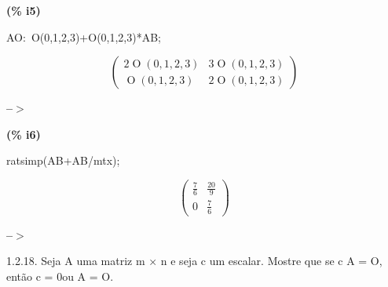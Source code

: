 \documentclass[fleqn]{article}
\begin{document}
\noindent
\begin{minipage}[t]{4.000000em}\color{red}\bfseries
(\% i5)	
\end{minipage}
\begin{minipage}[t]{\textwidth}\color{blue}
AO:\ O(0,1,2,3)+O(0,1,2,3)*AB;
\end{minipage}
\[\displaystyle \tag{AO} 
\begin{pmatrix}2 \mathop{O}\left( 0\mathop{,}1\mathop{,}2\mathop{,}3\right)  & 3 \mathop{O}\left( 0\mathop{,}1\mathop{,}2\mathop{,}3\right) \\
\mathop{O}\left( 0\mathop{,}1\mathop{,}2\mathop{,}3\right)  & 2 \mathop{O}\left( 0\mathop{,}1\mathop{,}2\mathop{,}3\right) \end{pmatrix}\mbox{}
\]


\noindent
\begin{minipage}[t]{4.000000em}\color{red}\bfseries
 --\ensuremath{\ensuremath{>}}	
\end{minipage}
\begin{minipage}[t]{\textwidth}\color{blue}

\end{minipage}

\noindent%



\noindent
\begin{minipage}[t]{4.000000em}\color{red}\bfseries
(\% i6)	
\end{minipage}
\begin{minipage}[t]{\textwidth}\color{blue}
ratsimp(AB+AB/mtx);
\end{minipage}
\[\displaystyle \tag{\% o6} 
\begin{pmatrix}\frac{7}{6} & \frac{20}{9}\\
0 & \frac{7}{6}\end{pmatrix}\mbox{}
\]


\noindent
\begin{minipage}[t]{4.000000em}\color{red}\bfseries
 --\ensuremath{\ensuremath{>}}	
\end{minipage}
\begin{minipage}[t]{\textwidth}\color{blue}

\end{minipage}

\noindent%

1.2.18. Seja A uma matriz m × n e seja c um escalar. Mostre que se c A = O, então c = 0ou A = O.
\end{document}
